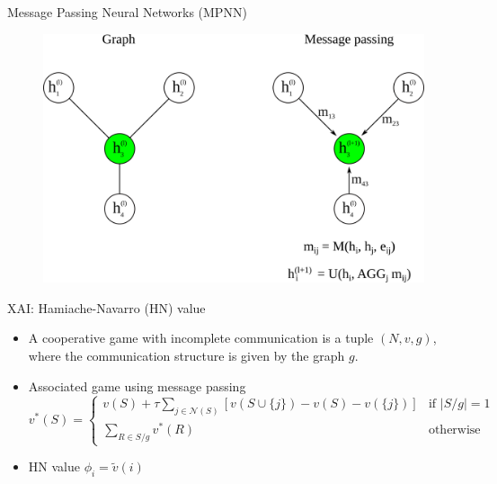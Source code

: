 \documentclass[aspectratio=169]{beamer}
\begin{document}
 
\begin{frame}{Message Passing Neural Networks (MPNN)}

    \begin{figure}[h]
        \centering 
        \includegraphics[scale=0.85]{./img/mpnn.png}
    \end{figure}

\end{frame}


\begin{frame}{XAI: Hamiache-Navarro (HN) value}

    \begin{itemize}[<+->]
        \item A cooperative game with incomplete communication is a tuple 
        $(N, v, g)$, where the communication structure is given by 
        the graph $g$.

        \item Associated game using message passing 
            \begin{equation}
                \label{eq:associated_game}
                v^*(S) =
                \begin{cases}
                    \displaystyle
                    v(S) + \tau \sum_{j \in \mathcal{N}(S)} \left[ v(S \cup \{j\}) - v(S) - v(\{j\}) \right] & \text{if } |S/g| = 1 \\
                    \displaystyle
                    \sum_{R \in S/g} v^*(R)                                                                   & \text{otherwise}
                \end{cases}
            \end{equation}

        \item HN value $\phi_i = \tilde{v}(i)$
    \end{itemize}

\end{frame}
\end{document}
